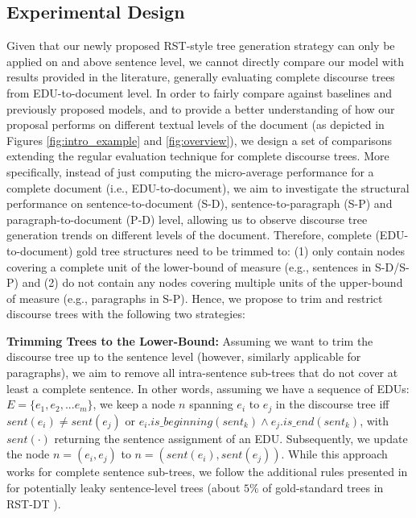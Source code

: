 \documentclass[letterpaper]{article} %
\begin{document}
\subsection{Experimental Design}
Given that our newly proposed RST-style tree generation strategy can only be applied on and above sentence level, we cannot directly compare our model with results provided in the literature, generally evaluating complete discourse trees from EDU-to-document level.
In order to fairly compare against baselines and previously proposed models, and to provide a better understanding of how our proposal performs on different textual levels of the document (as depicted in Figures \ref{fig:intro_example} and \ref{fig:overview}), we design a set of comparisons extending the regular evaluation technique for complete discourse trees.
More specifically, instead of just computing the micro-average performance for a complete document (i.e., EDU-to-document), we aim to investigate the structural performance on sentence-to-document (S-D), sentence-to-paragraph (S-P) and paragraph-to-document (P-D) level, allowing us to observe discourse tree generation trends on different levels of the document.
Therefore, complete (EDU-to-document) gold tree structures need to be trimmed to: (1) only contain nodes covering a complete unit of the lower-bound of measure (e.g., sentences in S-D/S-P) and (2) do not contain any nodes covering multiple units of the upper-bound of measure (e.g., paragraphs in S-P). Hence, we propose to trim and restrict discourse trees with the following two strategies:

\noindent
\textbf{Trimming Trees to the Lower-Bound:}
Assuming we want to trim the discourse tree up to the sentence level (however, similarly applicable for paragraphs), we aim to remove all intra-sentence sub-trees that do not cover at least a complete sentence. In other words, assuming we have a sequence of EDUs: $E = \{e_1, e_2, ...e_m\}$, we keep a node $n$ spanning $e_i$ to $e_j$ in the discourse tree iff $sent(e_i) \neq sent(e_j)$ or $e_i.is\_beginning(sent_k) \land e_j.is\_end(sent_k)$, with $sent(\cdot)$ returning the sentence assignment of an EDU. Subsequently, we update the node $n = (e_i, e_j)$ to $n = (sent(e_i), sent(e_j))$. While this approach works for complete sentence
sub-trees, we follow the additional rules presented in \citet{sporleder-lascarides-2004-combining} for potentially leaky sentence-level trees (about $5\%$ of gold-standard trees in RST-DT \cite{joty-etal-2015-codra}).
\end{document}
